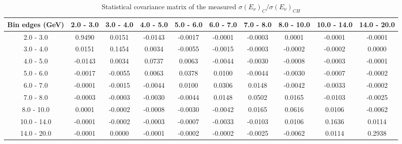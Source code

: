 \documentclass[aps,prl,twocolumn,superscriptaddress,nofootinbib]{revtex4-1}
\begin{document}
\begin{table}[h!]
  \centering
  \caption{Statistical covariance matrix of the measured $\sigma(E_{\nu})_{C}/\sigma(E_{\nu})_{CH}$}
    \begin{tabular}{c||ccccccccc}
      Bin edges (GeV) & 2.0 - 3.0 & 3.0 - 4.0 & 4.0 - 5.0 & 5.0 - 6.0 & 6.0 - 7.0 & 7.0 - 8.0 & 8.0 - 10.0 & 10.0 - 14.0 & 14.0 - 20.0 \\
\hline \hline
        2.0 - 3.0 &  0.9490 &  0.0151 & -0.0143 & -0.0017 & -0.0001 & -0.0003 &  0.0001 & -0.0001 & -0.0001 \\
        3.0 - 4.0 &  0.0151 &  0.1454 &  0.0034 & -0.0055 & -0.0015 & -0.0003 & -0.0002 & -0.0002 &  0.0000 \\
        4.0 - 5.0 & -0.0143 &  0.0034 &  0.0737 &  0.0063 & -0.0044 & -0.0030 & -0.0008 & -0.0003 & -0.0001 \\
        5.0 - 6.0 & -0.0017 & -0.0055 &  0.0063 &  0.0378 &  0.0100 & -0.0044 & -0.0030 & -0.0007 & -0.0002 \\
        6.0 - 7.0 & -0.0001 & -0.0015 & -0.0044 &  0.0100 &  0.0306 &  0.0148 & -0.0042 & -0.0033 & -0.0002 \\
        7.0 - 8.0 & -0.0003 & -0.0003 & -0.0030 & -0.0044 &  0.0148 &  0.0502 &  0.0165 & -0.0103 & -0.0025 \\
       8.0 - 10.0 &  0.0001 & -0.0002 & -0.0008 & -0.0030 & -0.0042 &  0.0165 &  0.0616 &  0.0106 & -0.0062 \\
      10.0 - 14.0 & -0.0001 & -0.0002 & -0.0003 & -0.0007 & -0.0033 & -0.0103 &  0.0106 &  0.1636 &  0.0114 \\
      14.0 - 20.0 & -0.0001 &  0.0000 & -0.0001 & -0.0002 & -0.0002 & -0.0025 & -0.0062 &  0.0114 &  0.2938 \\
    \end{tabular}
  \label{tablecov:C_Statistical_Enu}
\end{table}
\end{document}

